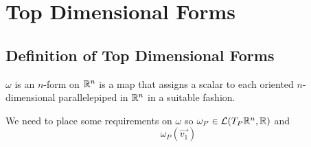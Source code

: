 \documentclass[notes.tex]{subfiles}
\begin{document}
\setcounter{section}{5}
\section{Top Dimensional Forms}
\subsection{Definition of Top Dimensional Forms}

\begin{definition}
    $\omega$ is an $n$-form on $\mathbb{R}^n$ is a map that assigns a scalar to each oriented $n$-dimensional parallelepiped in $\mathbb{R}^n$ in a suitable fashion.
\end{definition}

We need to place some requirements on $\omega$ so $\omega_P \in \mathcal{L}(T_P\mathbb{R}^n, \mathbb{R})$ and
\[
    \omega_P(\vec{v_1})
\]
\end{document}
